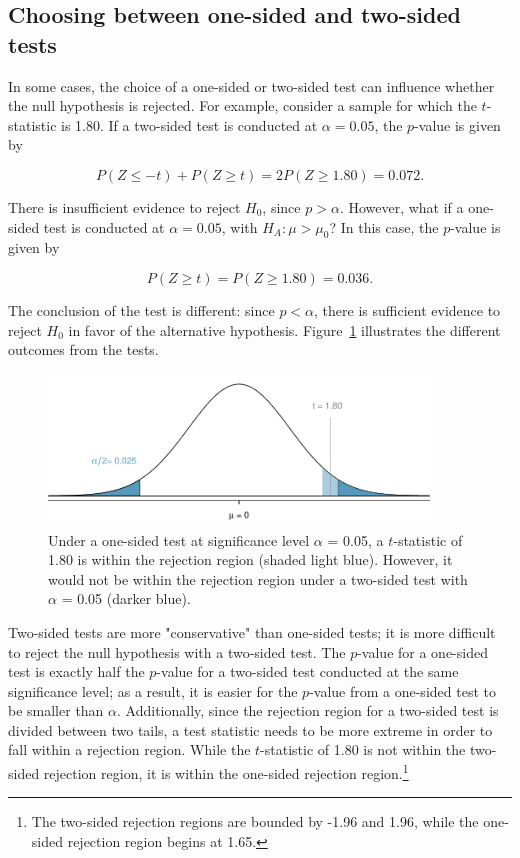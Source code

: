 \begin{spacing}{1.5}

\subsection{Choosing between one-sided and two-sided tests}

In some cases, the choice of a one-sided or two-sided test can influence whether the null hypothesis is rejected. For example, consider a sample for which the $t$-statistic is 1.80. If a two-sided test is conducted at $\alpha = 0.05$, the $p$-value is given by

\[P(Z \leq -t) + P(Z \geq t)= 2P(Z \geq 1.80) = 0.072.\]

There is insufficient evidence to reject $H_0$, since $p > \alpha$. However, what if a one-sided test is conducted at $\alpha = 0.05$, with $H_A: \mu > \mu_0$? In this case, the $p$-value is given by

\[P(Z \geq t)= P(Z \geq 1.80) = 0.036.\]

The conclusion of the test is different: since $p < \alpha$, there is sufficient evidence to reject $H_0$ in favor of the alternative hypothesis. Figure~\ref{twoSidedTestConservative} illustrates the different outcomes from the tests.

\begin{figure}[h]
	\centering
	\includegraphics[width=0.9\textwidth]
	{ch_inference_foundations_oi_biostat/figures/twoSidedTestConservative/twoSidedTestConservative}
	\caption{Under a one-sided test at significance level $\alpha$ = 0.05, a $t$-statistic of 1.80 is within the rejection region (shaded light blue). However, it would not be within the rejection region under a two-sided test with $\alpha$ = 0.05 (darker blue).}
	\label{twoSidedTestConservative}
\end{figure}

Two-sided tests are more "conservative" than one-sided tests; it is more difficult to reject the null hypothesis with a two-sided test. The $p$-value for a one-sided test is exactly half the $p$-value for a two-sided test conducted at the same significance level; as a result, it is easier for the $p$-value from a one-sided test to be smaller than $\alpha$. Additionally, since the rejection region for a two-sided test is divided between two tails, a test statistic needs to be more extreme in order to fall within a rejection region. While the $t$-statistic of 1.80 is not within the two-sided rejection region, it is within the one-sided rejection region.\footnote{The two-sided rejection regions are bounded by -1.96 and 1.96, while the one-sided rejection region begins at 1.65.}


\end{spacing}
